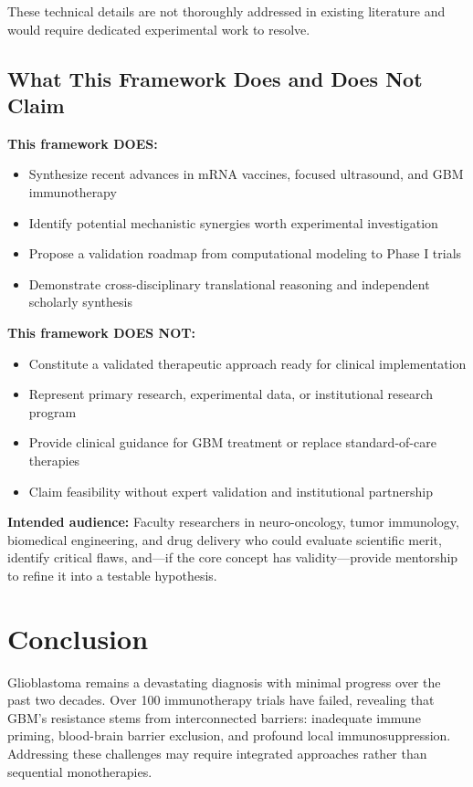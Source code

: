 \documentclass[12pt]{article}
\begin{document}
These technical details are not thoroughly addressed in existing literature and would require dedicated experimental work to resolve.

\subsection{What This Framework Does and Does Not Claim}
\textbf{This framework DOES:}
\begin{itemize}[leftmargin=*,noitemsep]
\item Synthesize recent advances in mRNA vaccines, focused ultrasound, and GBM immunotherapy
\item Identify potential mechanistic synergies worth experimental investigation
\item Propose a validation roadmap from computational modeling to Phase I trials
\item Demonstrate cross-disciplinary translational reasoning and independent scholarly synthesis
\end{itemize}

\textbf{This framework DOES NOT:}
\begin{itemize}[leftmargin=*,noitemsep]
\item Constitute a validated therapeutic approach ready for clinical implementation
\item Represent primary research, experimental data, or institutional research program
\item Provide clinical guidance for GBM treatment or replace standard-of-care therapies
\item Claim feasibility without expert validation and institutional partnership
\end{itemize}

\textbf{Intended audience:} Faculty researchers in neuro-oncology, tumor immunology, biomedical engineering, and drug delivery who could evaluate scientific merit, identify critical flaws, and—if the core concept has validity—provide mentorship to refine it into a testable hypothesis.

\section{Conclusion}

Glioblastoma remains a devastating diagnosis with minimal progress over the past two decades. Over 100 immunotherapy trials have failed, revealing that GBM's resistance stems from interconnected barriers: inadequate immune priming, blood-brain barrier exclusion, and profound local immunosuppression. Addressing these challenges may require integrated approaches rather than sequential monotherapies.
\end{document}
